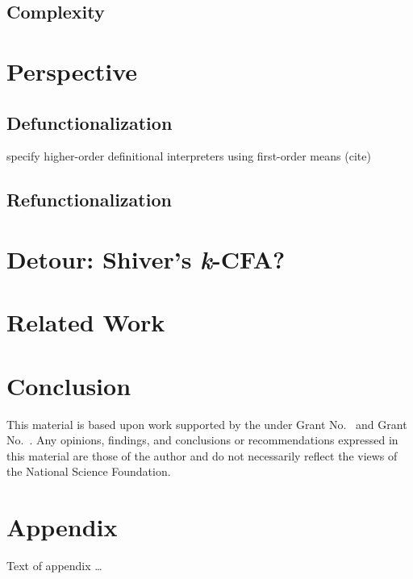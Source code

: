 \documentclass[acmsmall,review,anonymous]{acmart}\settopmatter{printfolios=true,printccs=false,printacmref=false}
\begin{document}
\subsection{Complexity}

\section{Perspective}

\subsection{Defunctionalization}

specify higher-order definitional interpreters using first-order means (cite)

\subsection{Refunctionalization}

\section{Detour: Shiver's \textit{k}-CFA?}

\section{Related Work}

\section{Conclusion}

\begin{acks}                            %
  This material is based upon work supported by the
   under Grant
  No.~ and Grant
  No.~.  Any opinions, findings, and
  conclusions or recommendations expressed in this material are those
  of the author and do not necessarily reflect the views of the
  National Science Foundation.
\end{acks}



\appendix
\section{Appendix}

Text of appendix \ldots
\end{document}
